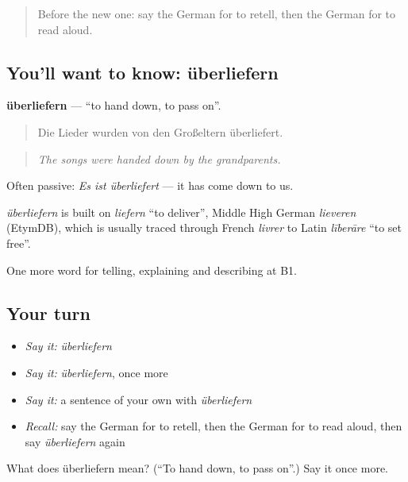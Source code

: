 \begin{quote}
Before the new one: say the German for to retell, then the German for to read aloud.
\end{quote}

\subsection*{You'll want to know: überliefern}
\textbf{überliefern} — \textquotedblleft{}to hand down, to pass on\textquotedblright{}.

\begin{quote}
Die Lieder wurden von den Großeltern überliefert.
\end{quote}

\begin{quote}
\emph{The songs were handed down by the grandparents.}
\end{quote}

Often passive: \emph{Es ist überliefert} — it has come down to us.

\begin{cousinweb}
\emph{überliefern} is built on \emph{liefern} \textquotedblleft{}to deliver\textquotedblright{}, Middle High German \emph{lieveren} (EtymDB), which is usually traced through French \emph{livrer} to Latin \emph{līberāre} \textquotedblleft{}to set free\textquotedblright{}.
\end{cousinweb}

\begin{grammarlens}[title={What you've built}]
One more word for telling, explaining and describing at B1.
\end{grammarlens}

\subsection*{Your turn}
\begin{itemize}
\raggedright
  \item \emph{Say it:} \emph{überliefern}
  \item \emph{Say it:} \emph{überliefern}, once more
  \item \emph{Say it:} a sentence of your own with \emph{überliefern}
  \item \emph{Recall:} say the German for to retell, then the German for to read aloud, then say \emph{überliefern} again
\end{itemize}

\begin{tcolorbox}[breakable,colback=teal!4,colframe=teal!35!black,title={Before you move on}]
What does überliefern mean? (\textquotedblleft{}To hand down, to pass on\textquotedblright{}.) Say it once more.
\end{tcolorbox}
